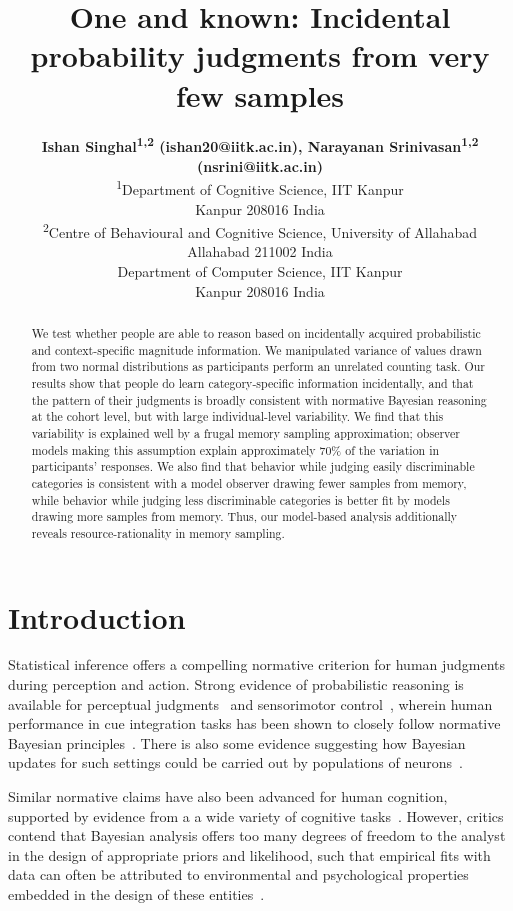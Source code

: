 \documentclass[10pt,letterpaper]{article}
\title{One and known: Incidental probability judgments from very few samples}
\author{{\large \bf Ishan Singhal\textsuperscript{1,2} (ishan20@iitk.ac.in), Narayanan Srinivasan\textsuperscript{1,2}  (nsrini@iitk.ac.in)} \\
  \textsuperscript{1}Department of Cognitive Science, IIT Kanpur \\
   Kanpur 208016 India\\
  \textsuperscript{2}Centre of Behavioural and Cognitive Science, University of Allahabad\\
  Allahabad 211002 India
  \AND {\large \bf Nisheeth Srivastava (nsrivast@iitk.ac.in)} \\
  Department of Computer Science, IIT Kanpur\\
  Kanpur 208016 India}
\begin{document}
\maketitle


\begin{abstract}
We test whether people are able to reason based on incidentally acquired probabilistic and context-specific magnitude information. We manipulated variance of values drawn from two normal distributions as participants perform an unrelated counting task. Our results show that people do learn category-specific information incidentally, and that the pattern of their judgments is broadly consistent with normative Bayesian reasoning at the cohort level, but with large individual-level variability. We find that this variability is explained well by a frugal memory sampling approximation; observer models making this assumption explain approximately 70\% of the variation in participants' responses. We also find that behavior while judging easily discriminable categories is  consistent with a model observer drawing fewer samples from memory,  while behavior while judging less discriminable categories is better fit by models drawing more samples from memory. Thus, our model-based analysis additionally reveals resource-rationality in memory sampling.


\end{abstract}

\section{Introduction}

Statistical inference offers a compelling normative criterion for human judgments during perception and action. Strong evidence of probabilistic reasoning is available for perceptual judgments~\cite{ernst2002humans} and sensorimotor control~\cite{kording2004bayesian}, wherein human performance in cue integration tasks has been shown to closely follow normative Bayesian principles~\cite{pouget2013probabilistic}. There is also some evidence suggesting how Bayesian updates for such settings could be carried out by populations of neurons~\cite{ma2006bayesian}.

Similar normative claims have also been advanced for human cognition, supported by evidence from a a wide variety of cognitive tasks~\cite{oaksford2007bayesian, tenenbaum2011grow}.
However, critics contend that Bayesian analysis offers too many degrees of freedom to the analyst in the design of appropriate priors and likelihood, such that empirical fits with data can often be attributed to environmental and psychological properties embedded in the design of these entities~\cite{jones2011bayesian}. 
\end{document}
